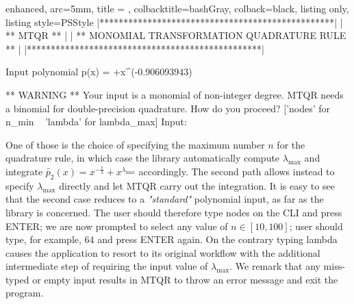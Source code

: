 \documentclass[a4paper, twosided]{book}
\begin{document}
\vspace{0.2cm}
\begin{tcblisting}{enhanced,
                   arc=5mm,
                   title = \color{black}{\large \ttfamily Executing the driver test case: p\_2(x)},
                   colbacktitle=bashGray,
                   colback=black,
                   listing only,
                   listing style=PSStyle}
    |*************************************************|
    |                 ** MTQR **                      |
    |  ** MONOMIAL TRANSFORMATION QUADRATURE RULE **  |
    |*************************************************|

 Input polynomial p(x) =  +x^(-0.906093943) 

 ** WARNING ** Your input is a monomial of non-integer degree.
               MTQR needs a binomial for double-precision quadrature.
               How do you proceed? ['nodes' for n_min ~ 'lambda' for lambda_max]
               Input: 
\end{tcblisting}
\vspace{0.3cm}

\noindent
One of those is the choice of specifying the maximum number $n$ for the quadrature rule, in which case the library  automatically compute $\lambda_{\text{max}}$ and integrate $\tilde{p_2}(x) = x^{-\frac{e}{3}} + x^{\lambda_\text{max}}$ accordingly. The second path allows instead to specify $\lambda_{\text{max}}$ directly and let MTQR carry out the integration. It is easy to see that the second case reduces to a \textsl{"standard"} polynomial input, as far as the library is concerned. The user should therefore type \colorbox{poliGrayBlue}{nodes} on the CLI and press \colorbox{poliGrayBlue}{ENTER}; we are now prompted to select any value of $n\in[10,100]$; user should type, for example, $64$ and press \colorbox{poliGrayBlue}{ENTER} again. On the contrary typing \colorbox{poliGrayBlue}{lambda} causes the application to resort to its original workflow with the additional intermediate step of requiring the input value of $\lambda_{\text{max}}$. We remark that any miss-typed or empty input results in MTQR to throw an error message and exit the program. 
\end{document}
